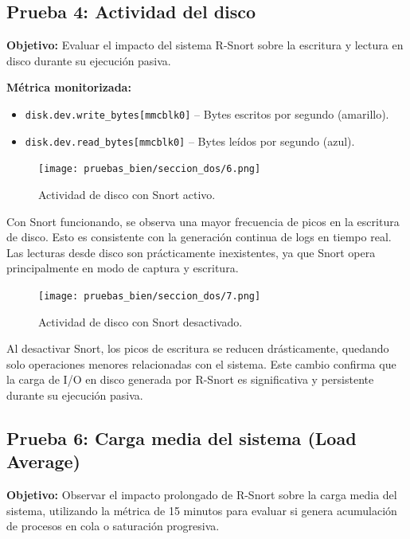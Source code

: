\documentclass[11pt,a4paper,twoside]{report}
\begin{document}
\subsection*{Prueba 4: Actividad del disco}

\textbf{Objetivo:}  
Evaluar el impacto del sistema R-Snort sobre la escritura y lectura en disco durante su ejecución pasiva.\newline

\textbf{Métrica monitorizada:}
\begin{itemize}
	\item \texttt{disk.dev.write\_bytes[mmcblk0]} – Bytes escritos por segundo (amarillo).
	\item \texttt{disk.dev.read\_bytes[mmcblk0]} – Bytes leídos por segundo (azul).
\end{itemize}

\begin{figure}[H]
	\centering
	\texttt{[image: pruebas\_bien/seccion\_dos/6.png]}
	\caption{Actividad de disco con Snort activo.}
\end{figure}

Con Snort funcionando, se observa una mayor frecuencia de picos en la escritura de disco. Esto es consistente con la generación continua de logs en tiempo real. Las lecturas desde disco son prácticamente inexistentes, ya que Snort opera principalmente en modo de captura y escritura.

\begin{figure}[H]
	\centering
	\texttt{[image: pruebas\_bien/seccion\_dos/7.png]}
	\caption{Actividad de disco con Snort desactivado.}
\end{figure}

Al desactivar Snort, los picos de escritura se reducen drásticamente, quedando solo operaciones menores relacionadas con el sistema. Este cambio confirma que la carga de I/O en disco generada por R-Snort es significativa y persistente durante su ejecución pasiva.\newline

\subsection*{Prueba 6: Carga media del sistema (Load Average)}

\textbf{Objetivo:}  
Observar el impacto prolongado de R-Snort sobre la carga media del sistema, utilizando la métrica de 15 minutos para evaluar si genera acumulación de procesos en cola o saturación progresiva.\newline
\end{document}

